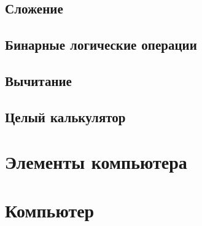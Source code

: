 \documentclass{book}
\begin{document}
\section{Сложение}

\section{Бинарные логические операции}

\section{Вычитание}

\section{Целый калькулятор}

\chapter{Элементы компьютера}

\chapter{Компьютер}
\end{document}
